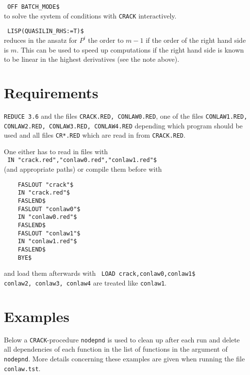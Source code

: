 \documentclass[12pt]{article}
\begin{document}
\verb+ OFF BATCH_MODE$+ \\
to solve the system of conditions with {\tt CRACK} interactively.

\verb+ LISP(QUASILIN_RHS:=T)$+ \\
reduces in the ansatz for $P^i$ the order to $m-1$ if the order of the
right hand side is $m$. This can be used to speed up computations if
the right hand side is known to be linear in the highest derivatives
(see the note above).

\section{Requirements}

{\tt REDUCE 3.6} and 
the files {\tt CRACK.RED, CONLAW0.RED}, one of the files
{\tt CONLAW1.RED, CONLAW2.RED, CONLAW3.RED, CONLAW4.RED} depending which
program should be used and all files {\tt CR*.RED} which 
are read in from {\tt CRACK.RED}.

One either has to read in files with \\
\verb+ IN "crack.red","conlaw0.red","conlaw1.red"$+ \\
\noindent (and appropriate paths) or compile them before with

\begin{verbatim}
    FASLOUT "crack"$
    IN "crack.red"$
    FASLEND$
    FASLOUT "conlaw0"$
    IN "conlaw0.red"$
    FASLEND$
    FASLOUT "conlaw1"$
    IN "conlaw1.red"$
    FASLEND$
    BYE$
\end{verbatim}
and load them afterwards with \verb+ LOAD crack,conlaw0,conlaw1$+ \\
\verb+conlaw2, conlaw3, conlaw4+ are treated like {\tt conlaw1}.

\section{Examples}
Below a {\tt CRACK}-procedure {\tt nodepnd} is used to clean up 
after each run and delete all dependencies of each 
function in the list of functions in the argument of {\tt nodepnd}.
More details concerning these examples are given when running
the file {\tt conlaw.tst}.
\end{document}
